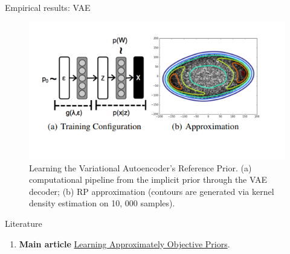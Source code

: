 \documentclass{beamer}
\begin{document}
\begin{frame}{Empirical results: VAE}
    \begin{figure}
        \centering
        \includegraphics[scale=0.56]{images/bmm_preza_2.png}
        \caption{Learning the Variational Autoencoder’s Reference Prior. (a) computational pipeline from the implicit prior through the VAE decoder; (b) RP approximation (contours are generated via kernel density estimation on 10, 000 samples).}
        \label{fig:enter-label}
    \end{figure}
\end{frame}


\begin{frame}{Literature}
    \begin{enumerate}
        \item \textbf{Main article} \href{https://arxiv.org/pdf/1704.01168.pdf}
        {Learning Approximately Objective Priors}.
    \end{enumerate}
\end{frame}
\end{document}

